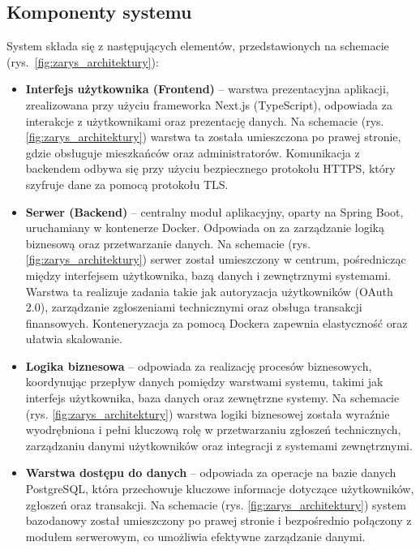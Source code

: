 \subsection{Komponenty systemu}
System składa się z następujących elementów, przedstawionych na schemacie (rys.~\ref{fig:zarys_architektury}): 

\begin{itemize}
	\item \textbf{Interfejs użytkownika (Frontend)} – warstwa prezentacyjna aplikacji, zrealizowana przy użyciu frameworka Next.js (TypeScript), odpowiada za interakcje z użytkownikami oraz prezentację danych. Na schemacie (rys. \ref{fig:zarys_architektury}) warstwa ta została umieszczona po prawej stronie, gdzie obsługuje mieszkańców oraz administratorów. Komunikacja z backendem odbywa się przy użyciu bezpiecznego protokołu HTTPS, który szyfruje dane za pomocą protokołu TLS.

	\item \textbf{Serwer (Backend)} – centralny moduł aplikacyjny, oparty na Spring Boot, uruchamiany w kontenerze Docker. Odpowiada on za zarządzanie logiką biznesową oraz przetwarzanie danych. Na schemacie (rys. \ref{fig:zarys_architektury}) serwer został umieszczony w centrum, pośrednicząc między interfejsem użytkownika, bazą danych i zewnętrznymi systemami. Warstwa ta realizuje zadania takie jak autoryzacja użytkowników (OAuth 2.0), zarządzanie zgłoszeniami technicznymi oraz obsługa transakcji finansowych. Konteneryzacja za pomocą Dockera zapewnia elastyczność oraz ułatwia skalowanie.

	\item \textbf{Logika biznesowa} – odpowiada za realizację procesów biznesowych, koordynując przepływ danych pomiędzy warstwami systemu, takimi jak interfejs użytkownika, baza danych oraz zewnętrzne systemy. Na schemacie (rys. \ref{fig:zarys_architektury}) warstwa logiki biznesowej została wyraźnie wyodrębniona i pełni kluczową rolę w przetwarzaniu zgłoszeń technicznych, zarządzaniu danymi użytkowników oraz integracji z systemami zewnętrznymi.

	\item \textbf{Warstwa dostępu do danych} – odpowiada za operacje na bazie danych PostgreSQL, która przechowuje kluczowe informacje dotyczące użytkowników, zgłoszeń oraz transakcji. Na schemacie (rys. \ref{fig:zarys_architektury}) system bazodanowy został umieszczony po prawej stronie i bezpośrednio połączony z modułem serwerowym, co umożliwia efektywne zarządzanie danymi.


\end{itemize}
